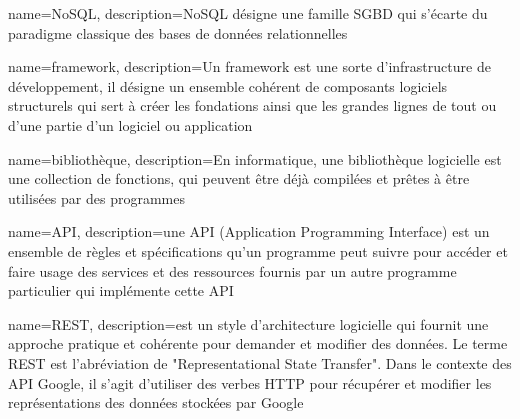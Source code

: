 {
    name=NoSQL,
    description={NoSQL désigne une famille SGBD qui s'écarte du paradigme classique des bases de données relationnelles}
}

{
    name=framework,
    description={Un framework est une sorte d'infrastructure de développement, il désigne un ensemble cohérent de composants logiciels structurels qui sert à créer les fondations ainsi que les grandes lignes de tout ou d'une partie d'un logiciel ou application}
}

{
    name=bibliothèque,
    description={En informatique, une bibliothèque logicielle est une collection de fonctions, qui peuvent être déjà compilées et prêtes à être utilisées par des programmes}
}

{
    name=API,
    description={une API (Application Programming Interface) est un ensemble de règles et spécifications qu'un programme peut suivre pour accéder et faire usage des services et des ressources fournis par un autre programme particulier qui implémente cette API}
}

{
    name=REST,
    description={est un style d'architecture logicielle qui fournit une approche pratique et cohérente pour demander et modifier des données.
Le terme REST est l'abréviation de "Representational State Transfer". Dans le contexte des API Google, il s’agit d’utiliser des verbes HTTP pour récupérer et modifier les représentations des données stockées par Google}
}